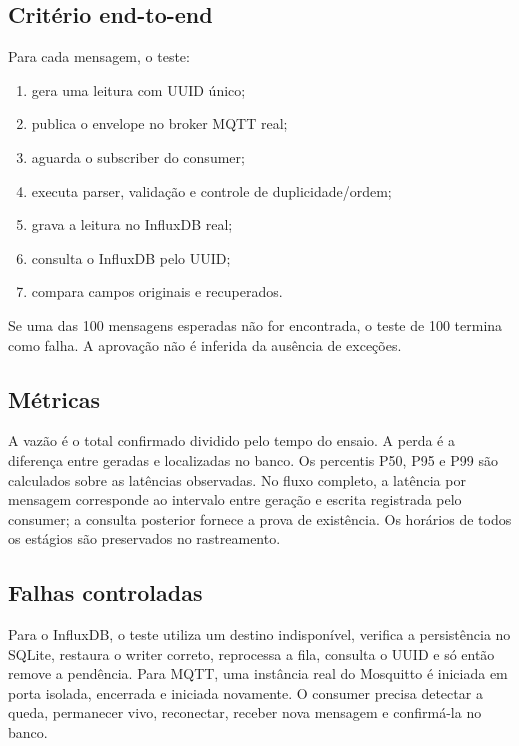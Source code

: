\documentclass[12pt,a4paper]{article}
\begin{document}
\subsection{Critério end-to-end}

Para cada mensagem, o teste:

\begin{enumerate}
  \item gera uma leitura com UUID único;
  \item publica o envelope no broker MQTT real;
  \item aguarda o subscriber do consumer;
  \item executa parser, validação e controle de duplicidade/ordem;
  \item grava a leitura no InfluxDB real;
  \item consulta o InfluxDB pelo UUID;
  \item compara campos originais e recuperados.
\end{enumerate}

Se uma das 100 mensagens esperadas não for encontrada, o teste de 100 termina como falha. A aprovação não é inferida da ausência de exceções.

\subsection{Métricas}

A vazão é o total confirmado dividido pelo tempo do ensaio. A perda é a diferença entre geradas e localizadas no banco. Os percentis P50, P95 e P99 são calculados sobre as latências observadas. No fluxo completo, a latência por mensagem corresponde ao intervalo entre geração e escrita registrada pelo consumer; a consulta posterior fornece a prova de existência. Os horários de todos os estágios são preservados no rastreamento.

\subsection{Falhas controladas}

Para o InfluxDB, o teste utiliza um destino indisponível, verifica a persistência no SQLite, restaura o writer correto, reprocessa a fila, consulta o UUID e só então remove a pendência. Para MQTT, uma instância real do Mosquitto é iniciada em porta isolada, encerrada e iniciada novamente. O consumer precisa detectar a queda, permanecer vivo, reconectar, receber nova mensagem e confirmá-la no banco.
\end{document}
